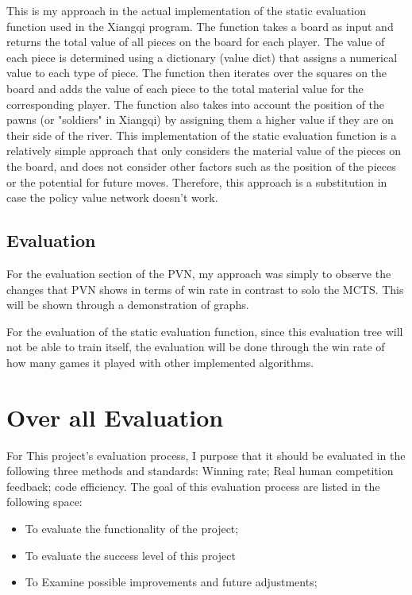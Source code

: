 \documentclass[10pt,twocolumn]{article}
\begin{document}
\begin{itemize}
   This is my approach in the actual implementation of the static evaluation function used in the Xiangqi program. The function takes a board as input and returns the total value of all pieces on the board for each player. The value of each piece is determined using a dictionary (value dict) that assigns a numerical value to each type of piece. The function then iterates over the squares on the board and adds the value of each piece to the total material value for the corresponding player. The function also takes into account the position of the pawns (or "soldiers" in Xiangqi) by assigning them a higher value if they are on their side of the river. This implementation of the static evaluation function is a relatively simple approach that only considers the material value of the pieces on the board, and does not consider other factors such as the position of the pieces or the potential for future moves. Therefore, this approach is a substitution in case the policy value network doesn't work. 

\subsection{Evaluation}
    For the evaluation section of the PVN, my approach was simply to observe the changes that PVN shows in terms of win rate in contrast to solo the MCTS. This will be shown through a demonstration of graphs.  

    For the evaluation of the static evaluation function, since this evaluation tree will not be able to train itself, the evaluation will be done through the win rate of how many games it played with other implemented algorithms. 

\end{itemize}

\section{Over all Evaluation}
    For This project's evaluation process, I purpose that it should be evaluated in the following three methods and standards: Winning rate; Real human competition feedback; code efficiency. The goal of this evaluation process are listed in the following space:

    \begin{itemize}
    \item To evaluate the functionality of the project;
    \item To evaluate the success level of this project 
    \item To Examine possible improvements and future adjustments;
\end{itemize}
    
\end{document}
